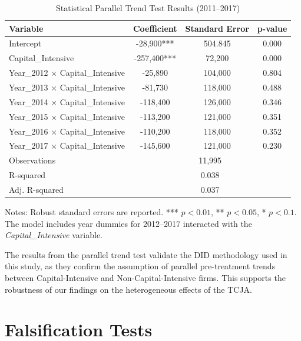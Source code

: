 \documentclass[11pt]{article}
\begin{document}
\begin{table}[htbp]
    \centering
    \caption{Statistical Parallel Trend Test Results (2011–2017)}
    \label{parallel_trend_table}
    \begin{tabular}{lccc}
        \toprule
        \textbf{Variable} & \textbf{Coefficient} & \textbf{Standard Error} & \textbf{p-value} \\
        \midrule
        Intercept & -28,900*** & 504.845 & 0.000 \\
        Capital\_Intensive & -257,400*** & 72,200 & 0.000 \\
        Year\_2012 × Capital\_Intensive & -25,890 & 104,000 & 0.804 \\
        Year\_2013 × Capital\_Intensive & -81,730 & 118,000 & 0.488 \\
        Year\_2014 × Capital\_Intensive & -118,400 & 126,000 & 0.346 \\
        Year\_2015 × Capital\_Intensive & -113,200 & 121,000 & 0.351 \\
        Year\_2016 × Capital\_Intensive & -110,200 & 118,000 & 0.352 \\
        Year\_2017 × Capital\_Intensive & -145,600 & 121,000 & 0.230 \\
        \midrule
        Observations & \multicolumn{3}{c}{11,995} \\
        R-squared & \multicolumn{3}{c}{0.038} \\
        Adj. R-squared & \multicolumn{3}{c}{0.037} \\
        \bottomrule
    \end{tabular}
    \begin{flushleft}
        \footnotesize
        Notes: Robust standard errors are reported. *** \(p<0.01\), ** \(p<0.05\), * \(p<0.1\). The model includes year dummies for 2012–2017 interacted with the \textit{Capital\_Intensive} variable.
    \end{flushleft}
\end{table}

The results from the parallel trend test validate the DID methodology used in this study, as they confirm the assumption of parallel pre-treatment trends between Capital-Intensive and Non-Capital-Intensive firms. This supports the robustness of our findings on the heterogeneous effects of the TCJA.

\section{Falsification Tests}
\end{document}
